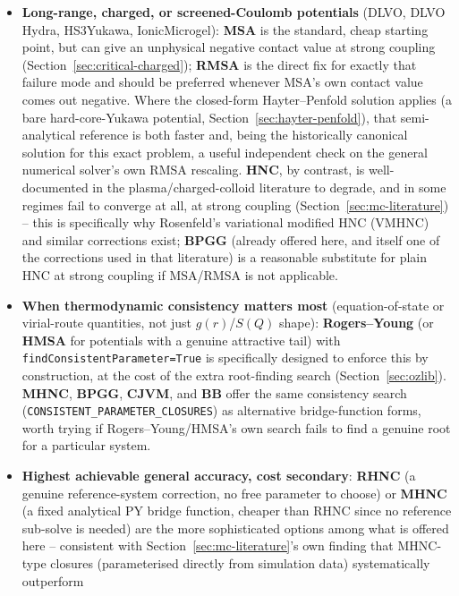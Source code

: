 \documentclass[11pt,a4paper]{article}
\newcommand{\code}[1]{\texttt{#1}}
\begin{document}
\begin{itemize}[nosep]
  \item \textbf{Long-range, charged, or screened-Coulomb potentials}
    (DLVO, DLVO Hydra, HS3Yukawa, IonicMicrogel): \textbf{MSA} is the
    standard, cheap starting point, but can give an unphysical negative
    contact value at strong coupling (Section~\ref{sec:critical-charged});
    \textbf{RMSA} is the direct fix for exactly that failure mode and should
    be preferred whenever MSA's own contact value comes out negative. Where
    the closed-form Hayter--Penfold solution applies (a bare hard-core-Yukawa
    potential, Section~\ref{sec:hayter-penfold}), that semi-analytical
    reference is both faster and, being the historically canonical solution
    for this exact problem, a useful independent check on the general
    numerical solver's own RMSA rescaling. \textbf{HNC}, by contrast, is
    well-documented in the plasma/charged-colloid literature to degrade, and
    in some regimes fail to converge at all, at strong coupling
    (Section~\ref{sec:mc-literature}) -- this is specifically why
    Rosenfeld's variational modified HNC (VMHNC) \cite{rosenfeld1986} and
    similar corrections exist; \textbf{BPGG} (already offered here, and
    itself one of the corrections used in that literature) is a reasonable
    substitute for plain HNC at strong coupling if MSA/RMSA is not
    applicable.
  \item \textbf{When thermodynamic consistency matters most} (equation-of-state
    or virial-route quantities, not just $g(r)$/$S(Q)$ shape): \textbf{Rogers--Young}
    (or \textbf{HMSA} for potentials with a genuine attractive tail) with
    \code{findConsistentParameter=True} is specifically designed to enforce
    this by construction, at the cost of the extra root-finding search
    (Section~\ref{sec:ozlib}). \textbf{MHNC}, \textbf{BPGG}, \textbf{CJVM},
    and \textbf{BB} offer the same consistency search
    (\code{CONSISTENT\_PARAMETER\_CLOSURES}) as alternative bridge-function
    forms, worth trying if Rogers--Young/HMSA's own search fails to find a
    genuine root for a particular system.
  \item \textbf{Highest achievable general accuracy, cost secondary}:
    \textbf{RHNC} (a genuine reference-system correction, no free parameter
    to choose) or \textbf{MHNC} (a fixed analytical PY bridge function,
    cheaper than RHNC since no reference sub-solve is needed) are the more
    sophisticated options among what is offered here -- consistent with
    Section~\ref{sec:mc-literature}'s own finding that MHNC-type closures
    (parameterised directly from simulation data) systematically outperform

\end{itemize}
\end{document}
